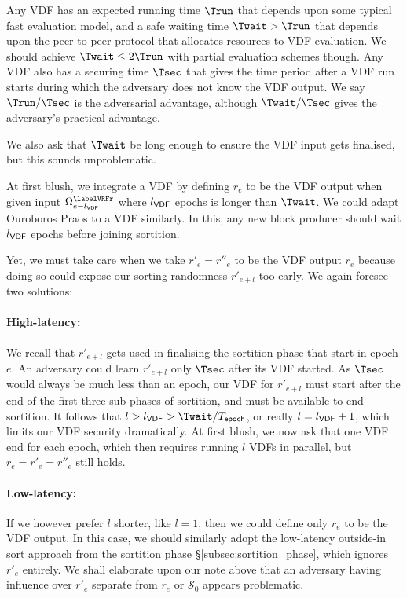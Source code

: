 Any VDF has an expected running time $\Trun$ that depends upon some typical fast evaluation model, and a safe waiting time $\Twait > \Trun$ that depends upon the peer-to-peer protocol that allocates resources to VDF evaluation.  We should achieve $\Twait \le 2 \Trun$ with partial evaluation schemes though.  Any VDF also has a securing time $\Tsec$ that gives the time period after a VDF run starts during which the adversary does not know the VDF output.  We say $\Trun/\Tsec$ is the adversarial advantage, although $\Twait/\Tsec$ gives the adversary's practical advantage.  

We also ask that $\Twait$ be long enough to ensure the VDF input gets finalised, but this sounds unproblematic.  

At first blush, we integrate a VDF by defining $r_e$ to be the VDF output when given input $\Omega^{\labelVRFr}_{e-\epochsdelayforVDF}$ where $l_{\mathsf{VDF}}$ epochs is longer than $\Twait$.  We could adapt Ouroboros Praos \cite{Praos} to a VDF similarly.  In this, any new block producer should wait $l_{\mathsf{VDF}}$ epochs before joining sortition. 

Yet, we must take care when we take $r'_e = r''_e$ to be the VDF output $r_e$ because doing so could expose our sorting randomness $r'_{e+l}$ too early.  We again foresee two solutions:

\paragraph{High-latency:} 
We recall that $r'_{e+l}$ gets used in finalising the sortition phase that start in epoch $e$.  An adversary could learn $r'_{e+l}$ only $\Tsec$ after its VDF started.  As $\Tsec$ would always be much less than an epoch, our VDF for $r'_{e+l}$ must start after the end of the first three sub-phases of sortition, and must be available to end sortition.  It follows that $l > \epochsdelayforVDF > \Twait/T_{\mathsf{epoch}}$, or really $l = l_{\mathsf{VDF}} + 1$, which limits our VDF security dramatically.  At first blush, we now ask that one VDF end for each epoch, which then requires running $l$ VDFs in parallel, but $r_e = r'_e = r''_e$ still holds.

\paragraph{Low-latency:} 
If we however prefer $l$ shorter, like $l=1$, then we could define only $r_e$ to be the VDF output.  In this case, we should similarly adopt the low-latency outside-in sort approach from the sortition phase \S\ref{subsec:sortition_phase}, which ignores $r'_e$ entirely.  We shall elaborate upon our note above that an adversary having influence over $r'_e$ separate from $r_e$ or $\mathcal{S}_0$ appears problematic.

